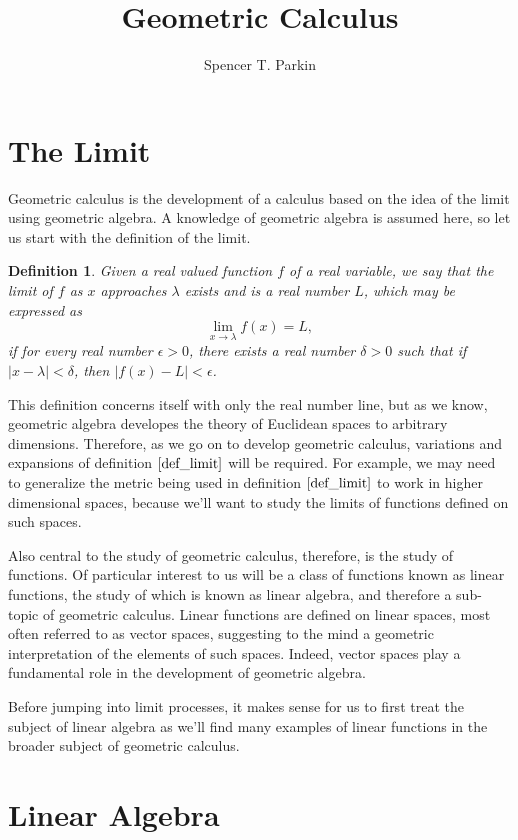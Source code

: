 \documentclass[12pt]{article}
\title{Geometric Calculus}
\author{Spencer T. Parkin}
\newtheorem{definition}{Definition}[section]
\begin{document}
\maketitle

\section{The Limit}

Geometric calculus is the development of a calculus based on the idea of the limit
using geometric algebra.  A knowledge of geometric algebra is assumed here, so
let us start with the definition of the limit.
\begin{definition}\label{def_limit}
Given a real valued function $f$ of a real variable, we say that the limit
of $f$ as $x$ approaches $\lambda$ exists and is a real number $L$, which
may be expressed as
\begin{equation*}
\lim_{x\to\lambda}f(x) = L,
\end{equation*}
if for every real number $\epsilon>0$, there exists a real number $\delta>0$
such that if $|x-\lambda|<\delta$, then $|f(x)-L|<\epsilon$.
\end{definition}
This definition concerns itself with only the real number line, but as we know, geometric
algebra developes the theory of Euclidean spaces to arbitrary dimensions.  Therefore,
as we go on to develop geometric calculus, variations and expansions of definition $\eqref{def_limit}$
will be required.  For example, we may need to generalize the metric being used in
definition $\eqref{def_limit}$ to work in higher dimensional spaces, because we'll
want to study the limits of functions defined on such spaces.

Also central to the study of geometric calculus, therefore, is the study of functions.
Of particular interest to us will be a class of functions known as linear functions,
the study of which is known as linear algebra, and therefore a sub-topic of geometric calculus.
Linear functions are defined on linear spaces, most often referred to as vector spaces,
suggesting to the mind a geometric interpretation of the elements of such spaces.
Indeed, vector spaces play a fundamental role in the development of geometric algebra.

Before jumping into limit processes, it makes sense for us to first treat the subject
of linear algebra as we'll find many examples of linear functions in the broader
subject of geometric calculus.

\section{Linear Algebra}
\end{document}
